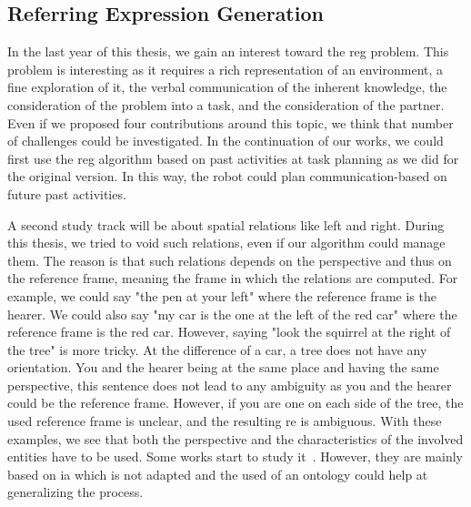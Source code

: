 \subsection*{Referring Expression Generation}

In the last year of this thesis, we gain an interest toward the \acrfull{reg} problem. This problem is interesting as it requires a rich representation of an environment, a fine exploration of it, the verbal communication of the inherent knowledge, the consideration of the problem into a task, and the consideration of the partner. Even if we proposed four contributions around this topic, we think that number of challenges could be investigated. In the continuation of our works, we could first use the \acrshort{reg} algorithm based on past activities at task planning as we did for the original version. In this way, the robot could plan communication-based on future past activities.

A second study track will be about spatial relations like left and right. During this thesis, we tried to void such relations, even if our algorithm could manage them. The reason is that such relations depends on the perspective and thus on the reference frame, meaning the frame in which the relations are computed. For example, we could say "the pen at your left" where the reference frame is the hearer. We could also say "my car is the one at the left of the red car" where the reference frame is the red car. However, saying "look the squirrel at the right of the tree" is more tricky. At the difference of a car, a tree does not have any orientation. You and the hearer being at the same place and having the same perspective, this sentence does not lead to any ambiguity as you and the hearer could be the reference frame. However, if you are one on each side of the tree, the used reference frame is unclear, and the resulting \acrshort{re} is ambiguous. With these examples, we see that both the perspective and the characteristics of the involved entities have to be used. Some works start to study it~\cite{kelleher_2006_incremental, dos_2015_generating}. However, they are mainly based on \acrlong{ia} which is not adapted and the used of an ontology could help at generalizing the process.

